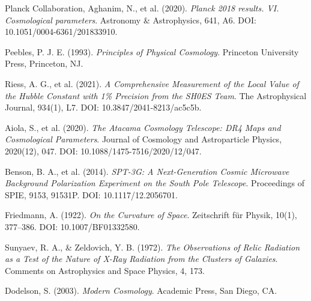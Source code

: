 \documentclass[a4paper,12pt]{article}
\theoremstyle{definition}
\theoremstyle{remark}
\begin{document}
	\begin{thebibliography}{9}
		
		Planck Collaboration, Aghanim, N., et al. (2020). 
		\textit{Planck 2018 results. VI. Cosmological parameters}. 
		Astronomy \& Astrophysics, 641, A6. 
		DOI: 10.1051/0004-6361/201833910.
		
		Peebles, P. J. E. (1993). 
		\textit{Principles of Physical Cosmology}. 
		Princeton University Press, Princeton, NJ.
		
		Riess, A. G., et al. (2021). 
		\textit{A Comprehensive Measurement of the Local Value of the Hubble Constant with 1\% Precision from the SH0ES Team}. 
		The Astrophysical Journal, 934(1), L7. 
		DOI: 10.3847/2041-8213/ac5c5b.
		
		Aiola, S., et al. (2020). 
		\textit{The Atacama Cosmology Telescope: DR4 Maps and Cosmological Parameters}. 
		Journal of Cosmology and Astroparticle Physics, 2020(12), 047. 
		DOI: 10.1088/1475-7516/2020/12/047.
		
		Benson, B. A., et al. (2014). 
		\textit{SPT-3G: A Next-Generation Cosmic Microwave Background Polarization Experiment on the South Pole Telescope}. 
		Proceedings of SPIE, 9153, 91531P. 
		DOI: 10.1117/12.2056701.
		
		Friedmann, A. (1922). 
		\textit{On the Curvature of Space}. 
		Zeitschrift für Physik, 10(1), 377–386. 
		DOI: 10.1007/BF01332580.
		
		Sunyaev, R. A., \& Zeldovich, Y. B. (1972). 
		\textit{The Observations of Relic Radiation as a Test of the Nature of X-Ray Radiation from the Clusters of Galaxies}. 
		Comments on Astrophysics and Space Physics, 4, 173.
		
		Dodelson, S. (2003). 
		\textit{Modern Cosmology}. 
		Academic Press, San Diego, CA.
		
	\end{thebibliography}
	
\end{document}
